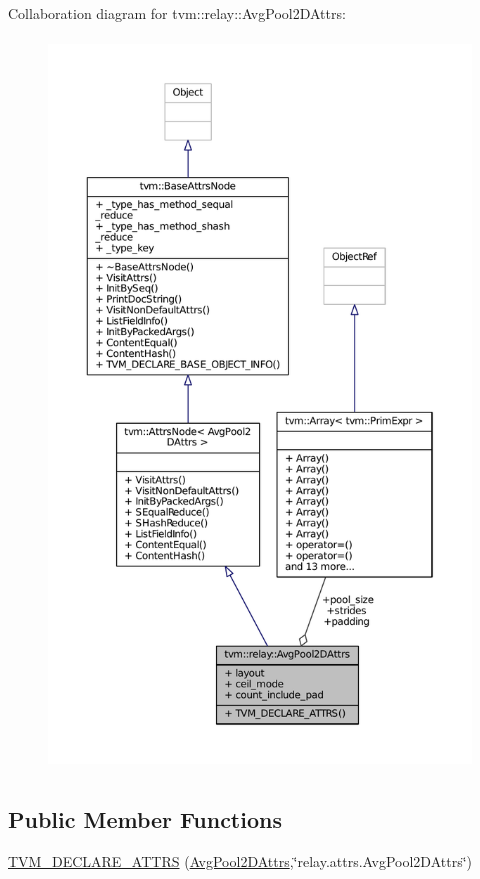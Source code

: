 Collaboration diagram for tvm\+:\+:relay\+:\+:Avg\+Pool2\+D\+Attrs\+:
\nopagebreak
\begin{figure}[H]
\begin{center}
\leavevmode
\includegraphics[height=550pt]{structtvm_1_1relay_1_1AvgPool2DAttrs__coll__graph}
\end{center}
\end{figure}
\subsection*{Public Member Functions}
\begin{DoxyCompactItemize}
\item 
\hyperlink{structtvm_1_1relay_1_1AvgPool2DAttrs_a49d891840d93c721a9533bca2e5ec94d}{T\+V\+M\+\_\+\+D\+E\+C\+L\+A\+R\+E\+\_\+\+A\+T\+T\+RS} (\hyperlink{structtvm_1_1relay_1_1AvgPool2DAttrs}{Avg\+Pool2\+D\+Attrs},\char`\"{}relay.\+attrs.\+Avg\+Pool2\+D\+Attrs\char`\"{})
\end{DoxyCompactItemize}

